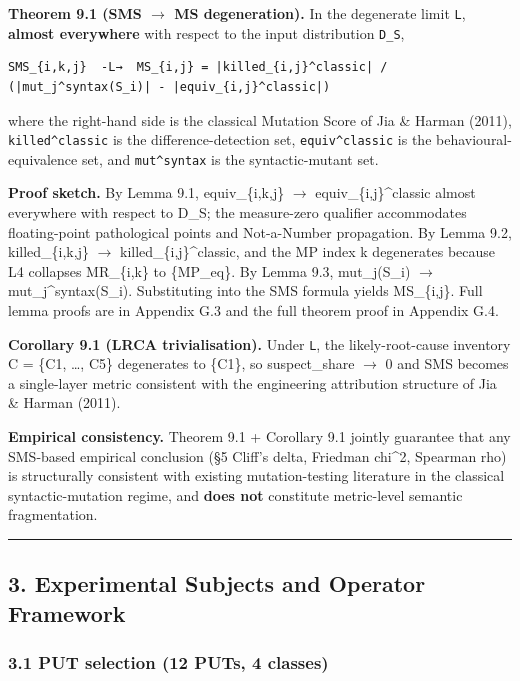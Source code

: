 \documentclass[review,12pt,authoryear]{elsarticle}
\begin{document}
\textbf{Theorem 9.1 (SMS $\to$ MS degeneration).} In the degenerate limit
\texttt{L}, \textbf{almost everywhere} with respect to the input
distribution \texttt{D\_S},

\begin{verbatim}
SMS_{i,k,j}  -L→  MS_{i,j} = |killed_{i,j}^classic| / (|mut_j^syntax(S_i)| - |equiv_{i,j}^classic|)
\end{verbatim}

where the right-hand side is the classical Mutation Score of Jia \&
Harman (2011), \texttt{killed\^{}classic} is the difference-detection
set, \texttt{equiv\^{}classic} is the behavioural-equivalence set, and
\texttt{mut\^{}syntax} is the syntactic-mutant set.

\textbf{Proof sketch.} By Lemma 9.1, equiv\_\{i,k,j\} $\to$
equiv\_\{i,j\}\^{}classic almost everywhere with respect to D\_S; the
measure-zero qualifier accommodates floating-point pathological points
and Not-a-Number propagation. By Lemma 9.2, killed\_\{i,k,j\} $\to$
killed\_\{i,j\}\^{}classic, and the MP index k degenerates because L4
collapses MR\_\{i,k\} to \{MP\_eq\}. By Lemma 9.3, mut\_j(S\_i) $\to$
mut\_j\^{}syntax(S\_i). Substituting into the SMS formula yields
MS\_\{i,j\}. Full lemma proofs are in Appendix G.3 and the full theorem
proof in Appendix G.4.

\textbf{Corollary 9.1 (LRCA trivialisation).} Under \texttt{L}, the
likely-root-cause inventory C = \{C1, \ldots, C5\} degenerates to
\{C1\}, so suspect\_share $\to$ 0 and SMS becomes a single-layer metric
consistent with the engineering attribution structure of Jia \& Harman
(2011).

\textbf{Empirical consistency.} Theorem 9.1 + Corollary 9.1 jointly
guarantee that any SMS-based empirical conclusion (§5 Cliff's delta,
Friedman chi\^{}2, Spearman rho) is structurally consistent with
existing mutation-testing literature in the classical syntactic-mutation
regime, and \textbf{does not} constitute metric-level semantic
fragmentation.

\begin{center}\rule{0.5\linewidth}{0.5pt}\end{center}

\subsection{3. Experimental Subjects and Operator
Framework}\label{experimental-subjects-and-operator-framework}

\subsubsection{3.1 PUT selection (12 PUTs, 4
classes)}\label{put-selection-12-puts-4-classes}
\end{document}
